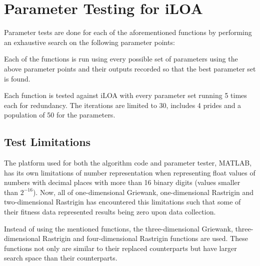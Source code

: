 \section{Parameter Testing for iLOA}

\par Parameter tests are done for each of the aforementioned functions by performing an exhaustive search on the following parameter points:


\par Each of the functions is run using every possible set of parameters using the above parameter points and their outputs recorded so that the best parameter set is found.

\par Each function is tested against iLOA with every parameter set running 5 times each for redundancy. The iterations are limited to 30, includes 4 prides and a population of 50 for the parameters.

\subsection{Test Limitations}
\par The platform used for both the algorithm code and parameter tester, MATLAB, has its own limitations of number representation when representing float values of numbers with decimal places with more than 16 binary digits (values smaller than $2^{-16}$). Now, all of one-dimensional Griewank, one-dimensional Rastrigin and two-dimensional Rastrigin has encountered this limitations such that some of their fitness data represented results being zero upon data collection.

\par Instead of using the mentioned functions, the three-dimensional Griewank, three-dimensional Rastrigin and four-dimensional Rastrigin functions are used. These functions not only are similar to their replaced counterparts but have larger search space than their counterparts.

